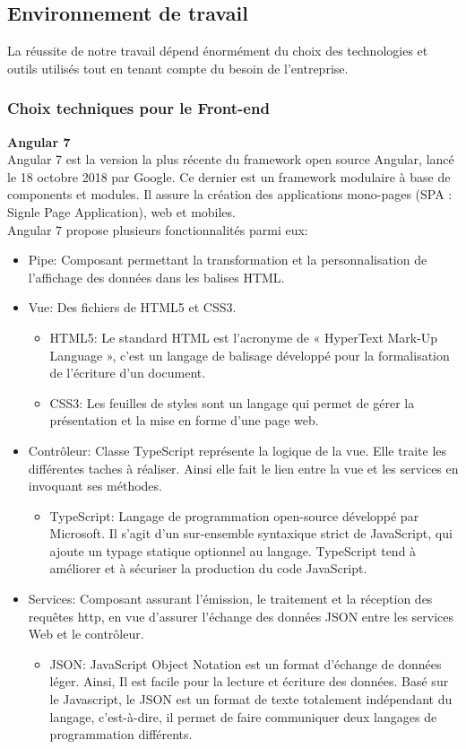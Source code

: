 \subsection{Environnement de travail}
La réussite  de notre travail dépend énormément du choix des technologies et outils utilisés tout en tenant compte du besoin de l'entreprise.
\subsubsection{Choix techniques  pour le Front-end}
\textbf{Angular 7}\\
Angular 7 est la version la plus récente du framework open source Angular, lancé le 18 octobre 2018 par Google. Ce dernier est un framework modulaire à base de components et modules. Il assure 
la création des applications mono-pages (SPA : Signle Page Application), web et mobiles. 
\\ 
Angular 7 propose plusieurs fonctionnalités parmi eux: 
\begin{itemize}
	\item Pipe: Composant permettant la transformation et la personnalisation de l'affichage des données  dans les balises HTML.
	\item Vue: Des fichiers de HTML5 et CSS3.
	\begin{itemize}
		\item  HTML5: Le standard HTML est l'acronyme de « HyperText Mark-Up Language », c'est un
		langage de balisage développé pour la formalisation de l'écriture d'un document. 
		\item CSS3: 
	Les feuilles de styles  sont un langage qui
	permet de gérer la présentation et la mise en forme d'une page web.	
	
	\end{itemize}
	\item Contrôleur: Classe TypeScript représente la logique de la vue. Elle traite les différentes taches à réaliser. Ainsi elle fait le lien entre la vue et les services en invoquant ses méthodes.
	\begin{itemize}
		\item TypeScript: Langage de programmation open-source développé par Microsoft. Il s'agit d'un sur-ensemble syntaxique strict de JavaScript, qui ajoute un typage statique optionnel au langage. TypeScript tend à améliorer et à sécuriser la production du
		code JavaScript.
	\end{itemize}
	\item Services: Composant assurant l'émission, le traitement et la réception des requêtes http, en vue  d'assurer l'échange des données JSON entre les services Web et le contrôleur.
	\begin{itemize}
		\item 
		JSON: JavaScript Object Notation est un format d'échange de données léger. Ainsi, Il est facile pour la lecture et écriture des données. Basé sur le Javascript, le JSON est un format de texte totalement indépendant du langage, c'est-à-dire, il permet de faire communiquer deux langages de programmation différents.
	\end{itemize}
\end{itemize}


